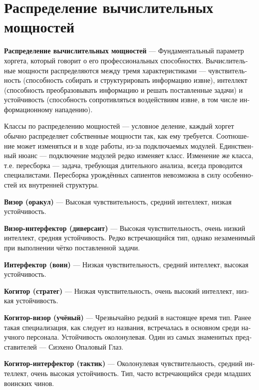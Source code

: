 \documentclass[a4paper,12pt,fleqn]{book}\usepackage{polyglossia}\setdefaultlanguage[babelshorthands=true]{russian}\setotherlanguage{english}\defaultfontfeatures{Ligatures=TeX,Mapping=tex-text}\usepackage{xcolor}\newcommand{\ml}[3]{#2}
\newcommand{\asterism}{\vspace{1em}{\centering\Large\bfseries$\ast~\ast~\ast$\par}\vspace{1em}}
\newcommand{\theterm}[3]{\textbf{\hypertarget{#1}{#2}} --- #3}
\begin{document}
\section{Распределение вычислительных мощностей}

\theterm{powers-distribution}
{Распределение вычислительных мощностей}
{Фундаментальный параметр хоргета, который говорит о его профессиональных способностях.
Вычислительные мощности распределяются между тремя характеристиками --- чувствительность (способность собирать и структурировать информацию извне), интеллект (способность преобразовывать информацию и решать поставленные задачи) и устойчивость (способность сопротивляться воздействиям извне, в том числе информационному нападению).

Классы по распределению мощностей --- условное деление, каждый хоргет обычно распределяет собственные мощности так, как ему требуется.
Соотношение может изменяться и в ходе работы, из-за подключаемых модулей.
Единственный нюанс --- подключение модулей редко изменяет класс.
Изменение же класса, т.е. пересборка --- задача, требующая длительного анализа, всегда проводится специалистами.
Пересборка урождённых сапиентов невозможна в силу особенностей их внутренней структуры.}

\asterism

\theterm{visor}
{Визор (оракул)}
{Высокая чувствительность, средний интеллект, низкая устойчивость.}

\theterm{saboteur}
{Визор-интерфектор (диверсант)}
{Высокая чувствительность, очень низкий интеллект, средняя устойчивость.
Редко встречающийся тип, однако незаменимый при выполнении чётко поставленной задачи.}

\theterm{interfector}
{Интерфектор (воин)}
{Низкая чувствительность, средний интеллект, высокая устойчивость.}

\theterm{cogitor}
{Когитор (стратег)}
{Низкая чувствительность, очень высокий интеллект, низкая устойчивость.}

\theterm{scientist}
{Когитор-визор (учёный)}
{Чрезвычайно редкий в настоящее время тип.
Ранее такая специализация, как следует из названия, встречалась в основном среди научного персонала.
Устойчивость околонулевая.
Один из самых знаменитых представителей --- Сиэхено Опаловый Глаз.}

\theterm{tactic}
{Когитор-интерфектор (тактик)}
{Околонулевая чувствительность, средний интеллект, очень высокая устойчивость.
Тип, часто встречающийся среди младших воинских чинов.}
\end{document}
